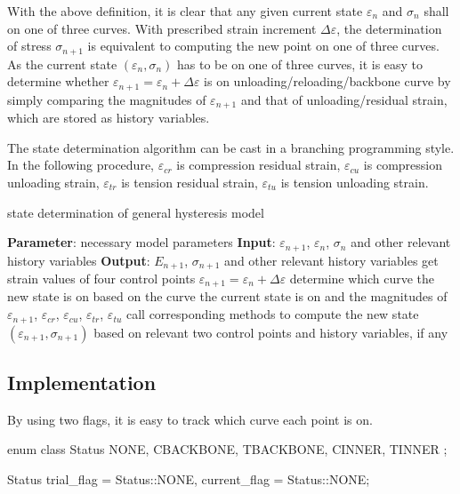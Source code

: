 With the above definition, it is clear that any given current state $\varepsilon_n$ and $\sigma_n$ shall on one of three curves. With prescribed strain increment $\Delta\varepsilon$, the determination of stress $\sigma_{n+1}$ is equivalent to computing the new point on one of three curves. As the current state $(\varepsilon_n,\sigma_n)$ has to be on one of three curves, it is easy to determine whether $\varepsilon_{n+1}=\varepsilon_n+\Delta\varepsilon$ is on unloading/reloading/backbone curve by simply comparing the magnitudes of $\varepsilon_{n+1}$ and that of unloading/residual strain, which are stored as history variables.

The state determination algorithm can be cast in a branching programming style. In the following procedure, $\varepsilon_{cr}$ is compression residual strain, $\varepsilon_{cu}$ is compression unloading strain, $\varepsilon_{tr}$ is tension residual strain, $\varepsilon_{tu}$ is tension unloading strain.
\begin{breakablealgorithm}
\caption{state determination of general hysteresis model}\label{algo:gen_hys}
\begin{algorithmic}[1]
\State \textbf{Parameter}: necessary model parameters
\State \textbf{Input}: $\varepsilon_{n+1}$, $\varepsilon_n$, $\sigma_n$ and other relevant history variables
\State \textbf{Output}: $E_{n+1}$, $\sigma_{n+1}$ and other relevant history variables
\State get strain values of four control points
\State $\varepsilon_{n+1}=\varepsilon_n+\Delta\varepsilon$
\State determine which curve the new state is on based on the curve the current state is on and the magnitudes of $\varepsilon_{n+1}$, $\varepsilon_{cr}$, $\varepsilon_{cu}$, $\varepsilon_{tr}$,  $\varepsilon_{tu}$
\State call corresponding methods to compute the new state $(\varepsilon_{n+1},\sigma_{n+1})$ based on relevant two control points and history variables, if any
\end{algorithmic}
\end{breakablealgorithm}

\subsection{Implementation}
By using two flags, it is easy to track which curve each point is on.
\begin{cppcode}
	enum class Status { NONE, CBACKBONE, TBACKBONE, CINNER, TINNER };

	Status trial_flag = Status::NONE, current_flag = Status::NONE;
\end{cppcode}

